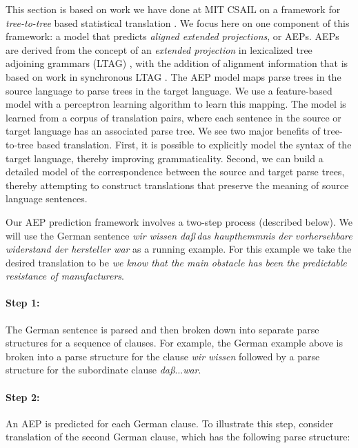 \documentclass[10pt]{report}
\theoremstyle{plain}
\begin{document}
{This section is based on work we have done at MIT CSAIL on a framework
for {\em tree-to-tree} based statistical translation .
We focus here on one component of this framework: a model that
predicts {\em aligned extended projections}, or AEPs. AEPs are derived
from the concept of an {\em extended projection} in lexicalized tree
adjoining grammars (LTAG) , with the addition of
alignment information that is based on work in synchronous LTAG
. The AEP model maps parse trees in the source
language to parse trees in the target language. We use a feature-based
model with a perceptron learning algorithm to learn this mapping. The
model is learned from a corpus of translation pairs, where each
sentence in the source or target language has an associated parse
tree.  We see two major benefits of tree-to-tree based
translation. First, it is possible to explicitly model the syntax of
the target language, thereby improving grammaticality. Second, we can
build a detailed model of the correspondence between the source and
target parse trees, thereby attempting to construct translations that
preserve the meaning of source language sentences.

Our AEP prediction framework involves a two-step process (described
below). We will use the German sentence {\em wir wissen da\ss\,das
haupthemmnis der vorhersehbare widerstand der hersteller war} as a
running example. For this example we take the desired translation to
be {\em we know that the main obstacle has been the predictable
resistance of manufacturers}.

\paragraph{Step 1:} The German sentence is parsed and then broken
down into separate parse structures for a sequence of clauses. For
example, the German example above is broken into a parse structure for
the clause {\em wir wissen} followed by a parse structure for the
subordinate clause {\em da\ss $\ldots$war}.

\paragraph{Step 2:} An AEP is predicted for
each German clause. To illustrate this step, consider translation of
the second German clause, which has the following parse structure:

}
\end{document}
